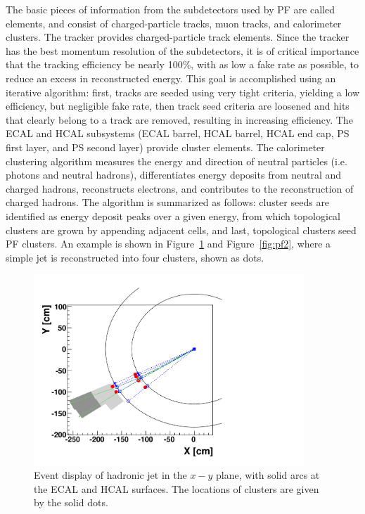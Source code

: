 \indent The basic pieces of information from the subdetectors used by PF are called elements, and consist of charged-particle tracks, muon tracks, and calorimeter clusters. The tracker provides charged-particle track elements. Since the tracker has the best momentum resolution of the subdetectors, it is of critical importance that the tracking efficiency be nearly 100\%, with as low a fake rate as possible, to reduce an excess in reconstructed energy. This goal is accomplished using an iterative algorithm: first, tracks are seeded using very tight criteria, yielding a low efficiency, but negligible fake rate, then track seed criteria are loosened and hits that clearly belong to a track are removed, resulting in increasing efficiency. The ECAL and HCAL subsystems (ECAL barrel, HCAL barrel, HCAL end cap, PS first layer, and PS second layer) provide cluster elements. The calorimeter clustering algorithm measures the energy and direction of neutral particles (i.e. photons and neutral hadrons), differentiates energy deposits from neutral and charged hadrons, reconstructs electrons, and contributes to the reconstruction of charged hadrons. The algorithm is summarized as follows: cluster seeds are identified as energy deposit peaks over a given energy, from which topological clusters are grown by appending adjacent cells, and last, topological clusters seed PF clusters. An example is shown in Figure~\ref{fig:pf1} and Figure~\ref{fig:pf2}, where a simple jet is reconstructed into four clusters, shown as dots. 


\begin{figure}[tbh]
\centering
\includegraphics[width=4in]{figures/PFa.pdf}
\caption{Event display of hadronic jet in the $x-y$ plane, with solid arcs at the ECAL and HCAL surfaces. The locations of clusters are given by the solid dots.}
\label{fig:pf1}
\end{figure}


